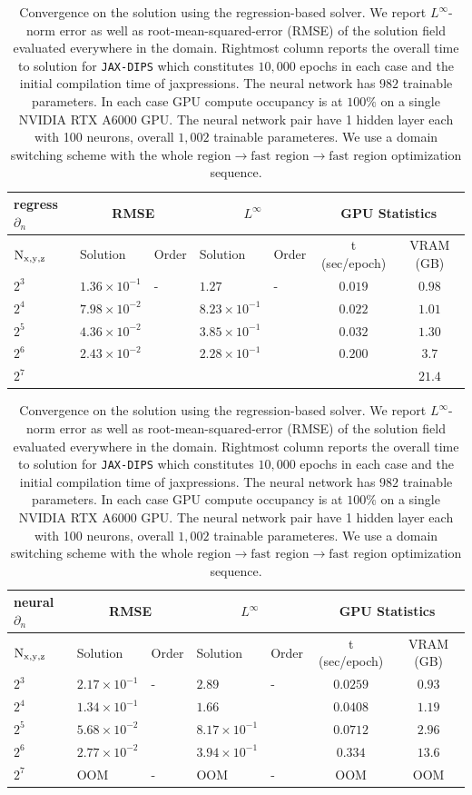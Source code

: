 \documentclass{elsarticle}
\begin{document}
\begin{table}[ht]
\begin{center}
\begin{tabular}{|l||ll|ll|c|c|}
\hline
regress $\partial_n$ & \multicolumn{2}{c|}{RMSE}& \multicolumn{2}{c|}{$L^\infty$} & \multicolumn{2}{c|}{GPU Statistics} \\
\hline
$\rm N_{x,y,z}$   &   Solution    &   Order   &   Solution   &   Order & t (sec/epoch) & VRAM (GB)\\
\hline 
$2^3$ & $ 1.36\times 10^{-1}$ &  -     & $ 1.27$                 &   -   & $ 0.019  $  & $  0.98 $ \\
$2^4$ & $ 7.98\times 10^{-2}$ &  $ $   & $ 8.23\times 10^{-1} $  & $ $   & $ 0.022  $  & $ 1.01  $ \\ 
$2^5$ & $ 4.36\times 10^{-2}$ &  $ $   & $ 3.85\times 10^{-1} $  & $  $  & $ 0.032  $  & $ 1.30  $ \\ 
$2^6$ & $2.43\times 10^{-2} $ &  $ $   & $ 2.28\times 10^{-1}$   & $ $   & $  0.200 $  & $ 3.7 $ \\ 
$2^7$ & $ $ &  $ $   & $ $   & $ $   & $   $  & $21.4 $ \\ \hline
\end{tabular}
\begin{tabular}{|l||ll|ll|c|c|}
\hline
neural $\partial_n$ & \multicolumn{2}{c|}{RMSE}& \multicolumn{2}{c|}{$L^\infty$} & \multicolumn{2}{c|}{GPU Statistics} \\
\hline
$\rm N_{x,y,z}$   &   Solution    &   Order   &   Solution   &   Order & t (sec/epoch) & VRAM (GB)\\
\hline 
$2^3$ & $2.17\times 10^{-1} $ &  -     & $2.89 $  &   -   & $0.0259 $ & $ 0.93$ \\
$2^4$ & $ 1.34\times 10^{-1	}$ &  $ $   & $ 1.66$  & $ $   & $ 0.0408$ & $1.19 $ \\ 
$2^5$ & $5.68\times 10^{-2} $ &  $ $   & $ 8.17\times 10^{-1}$  & $ $   & $ 0.0712$ & $ 2.96$ \\ 
$2^6$ & $ 2.77\times 10^{-2}$ &  $ $   & $3.94\times 10^{-1} $  & $ $   & $ 0.334 $ & $ 13.6$ \\ 
$2^7$ & OOM  &  -   & OOM  & -   & OOM & OOM \\ \hline
\end{tabular}
\caption{Convergence on the solution using the regression-based solver. We report $L^\infty$-norm error as well as root-mean-squared-error (RMSE) of the solution field evaluated everywhere in the domain. Rightmost column reports the overall time to solution for \texttt{JAX-DIPS} which constitutes $10,000$ epochs in each case and the initial compilation time of jaxpressions. The neural network has $982$ trainable parameters. In each case GPU compute occupancy is at $100\%$ on a single NVIDIA RTX A6000 GPU. The neural network pair have 1 hidden layer each with 100 neurons, overall $1,002$ trainable parameteres. We use a domain switching scheme with the $\textrm{whole region} \rightarrow \textrm{fast region} \rightarrow \textrm{fast region}$ optimization sequence.}
\end{center}
\end{table}
\end{document}
